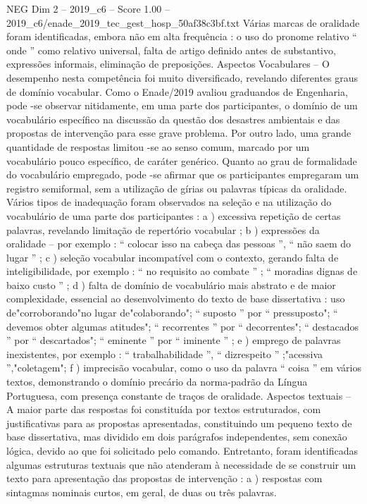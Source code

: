 \begin{textsample}{NEG Dim 2 – 2019\_c6 – Score 1.00 – 2019\_c6/enade\_2019\_tec\_gest\_hosp\_50af38c3bf.txt}
Várias marcas de oralidade foram identificadas, embora não em alta frequência : o uso do pronome relativo “ onde ” como relativo universal, falta de artigo definido antes de substantivo, expressões informais, eliminação de preposições.
Aspectos Vocabulares – O desempenho nesta competência foi muito diversificado, revelando diferentes graus de domínio vocabular.
Como o Enade/2019 avaliou graduandos de Engenharia, pode -se observar nitidamente, em uma parte dos participantes, o domínio de um vocabulário específico na discussão da questão dos desastres ambientais e das propostas de intervenção para esse grave problema.
Por outro lado, uma grande quantidade de respostas limitou -se ao senso comum, marcado por um vocabulário pouco específico, de caráter genérico.
Quanto ao grau de formalidade do vocabulário empregado, pode -se afirmar que os participantes empregaram um registro semiformal, sem a utilização de gírias ou palavras típicas da oralidade.
Vários tipos de inadequação foram observados na seleção e na utilização do vocabulário de uma parte dos participantes : a ) excessiva repetição de certas palavras, revelando limitação de repertório vocabular ; b ) expressões da oralidade – por exemplo : “ colocar isso na cabeça das pessoas ”, “ não saem do lugar ” ; c ) seleção vocabular incompatível com o contexto, gerando falta de inteligibilidade, por exemplo : “ no requisito ao combate ” ; “ moradias dignas de baixo custo ” ; d ) falta de domínio de vocabulário mais abstrato e de maior complexidade, essencial ao desenvolvimento do texto de base dissertativa : uso de"corroborando"no lugar de"colaborando"; “ suposto ” por “ pressuposto"; “ devemos obter algumas atitudes"; “ recorrentes ” por “ decorrentes"; “ destacados ” por “ descartados"; “ eminente ” por “ iminente ” ; e ) emprego de palavras inexistentes, por exemplo : “ trabalhabilidade ”, “ dizrespeito ” ;"acessiva ”,"coletagem"; f ) imprecisão vocabular, como o uso da palavra “ coisa ” em vários textos, demonstrando o domínio precário da norma-padrão da Língua Portuguesa, com presença constante de traços de oralidade.
Aspectos textuais – A maior parte das respostas foi constituída por textos estruturados, com justificativas para as propostas apresentadas, constituindo um pequeno texto de base dissertativa, mas dividido em dois parágrafos independentes, sem conexão lógica, devido ao que foi solicitado pelo comando.
Entretanto, foram identificadas algumas estruturas textuais que não atenderam à necessidade de se construir um texto para apresentação das propostas de intervenção : a ) respostas com sintagmas nominais curtos, em geral, de duas ou três palavras.

\end{textsample}

